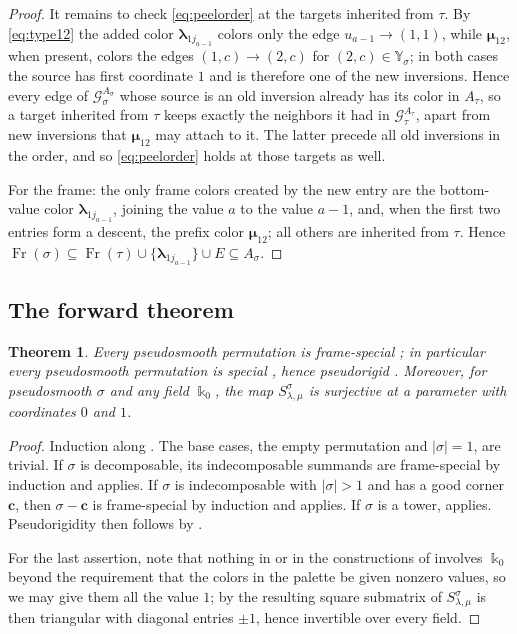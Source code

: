 \documentclass[12pt]{article}
\def\xspace{ }%
\newtheorem{theorem}{Theorem}[section]
\theoremstyle{definition}
\newcommand{\prig}{pseudorigid\xspace}
\newcommand{\Prigity}{Pseudorigidity\xspace}
\newcommand{\psm}{pseudosmooth\xspace}
\newcommand{\good}{good\xspace}
\newcommand{\spc}{special\xspace}
\newcommand{\pal}{palette\xspace}      %
\newcommand{\pset}{A}                  %
\newcommand{\kk}{\Bbbk}
\newcommand{\YY}{\mathbb{Y}}  %
\newcommand{\Sop}{S}
\newcommand{\Gc}{\mathcal{G}}          %
\newcommand{\Fr}{\operatorname{Fr}}    %
\newcommand{\blam}{\boldsymbol{\lambda}}   %
\newcommand{\bmu}{\boldsymbol{\mu}}        %
\newcommand{\crn}{\mathbf{c}}              %
\begin{document}
\begin{proof}
It remains to check \eqref{eq:peelorder} at the targets inherited from
$\tau$. By \eqref{eq:type12} the added color $\blam_{1j_{a-1}}$ colors only
the edge $u_{a-1} \to (1,1)$, while $\bmu_{12}$, when present, colors the
edges $(1,c) \to (2,c)$ for $(2,c) \in \YY_\sigma$; in both cases the source has
first coordinate $1$ and is therefore one of the new inversions. Hence
every edge of $\Gc^{\pset_\sigma}_\sigma$ whose source is an old inversion
already has its color in $\pset_\tau$, so a target inherited from $\tau$
keeps exactly the neighbors it had in $\Gc^{\pset_\tau}_\tau$, apart from
new inversions that $\bmu_{12}$ may attach to it. The latter precede all
old inversions in the order, and so \eqref{eq:peelorder} holds at those
targets as well.

For the frame: the only frame colors created by the new entry are the
bottom-value color $\blam_{1j_{a-1}}$, joining the value $a$ to the value
$a-1$, and, when the first two entries form a descent, the prefix color
$\bmu_{12}$; all others are inherited from $\tau$. Hence $\Fr(\sigma)
\subseteq \Fr(\tau)\cup\{\blam_{1j_{a-1}}\}\cup E \subseteq \pset_\sigma$.
\end{proof}

\subsection{The forward theorem}\label{ssec:forwardthm}

\begin{theorem}\label{thm:forward}
Every \psm permutation is frame-\spc; in particular every \psm
permutation is \spc, hence \prig. Moreover, for \psm $\sigma$ and any field
$\kk_0$, the map $\Sop^\sigma_{\lambda,\mu}$ is surjective at a parameter
with coordinates $0$ and $1$.
\end{theorem}

\begin{proof}
Induction along . The base cases, the empty permutation and $|\sigma|=1$, are trivial.
If $\sigma$ is decomposable, its indecomposable summands are frame-\spc by induction and
 applies.
If $\sigma$ is indecomposable with $|\sigma|>1$ and has a \good corner $\crn$, then $\sigma -
\crn$ is frame-\spc by induction and  applies. If
$\sigma$ is a tower,  applies.
\Prigity then follows by .

For the last assertion, note that nothing in  or in the
constructions of  involves $\kk_0$
beyond the requirement that the colors in the \pal be given nonzero values,
so we may give them all the value $1$; by  the resulting
square submatrix of $\Sop^\sigma_{\lambda,\mu}$ is then triangular with
diagonal entries $\pm1$, hence invertible over every field.
\end{proof}
\end{document}
